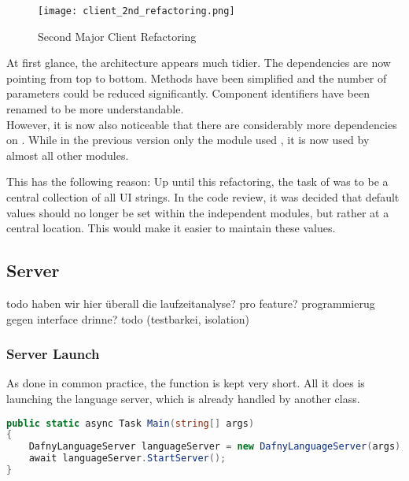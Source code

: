 \begin{figure}[H]
    \centering
    \texttt{[image: client\_2nd\_refactoring.png]}
    \caption{Second Major Client Refactoring}
    \label{fig:client_2nd_refactoring}
\end{figure}

At first glance, the architecture appears much tidier.
The dependencies are now pointing from top to bottom.
Methods have been simplified and the number of parameters could be reduced significantly.
Component identifiers have been renamed to be more understandable. \\

However, it is now also noticeable that there are considerably more dependencies on .
While in the previous version only the module  used , it is now used by almost all other modules.

This has the following reason: Up until this refactoring, the task of  was to be a central collection of all UI strings. 
In the code review, it was decided that default values should no longer be set within the independent modules,
but rather at a central location.
This would make it easier to maintain these values. \\


\subsection{Server}

todo haben wir hier überall die laufzeitanalyse? pro feature?
programmierug gegen interface drinne? todo (testbarkei, isolation)

\subsubsection{Server Launch}
As done in common practice, the  function is kept very short. All it does is launching the language server, which is already handled by another class.

\begin{lstlisting}[language=csharp, caption={Main Function}, captionpos=b, label={lst:main}]
public static async Task Main(string[] args)
{
    DafnyLanguageServer languageServer = new DafnyLanguageServer(args);
    await languageServer.StartServer();
}
\end{lstlisting}


